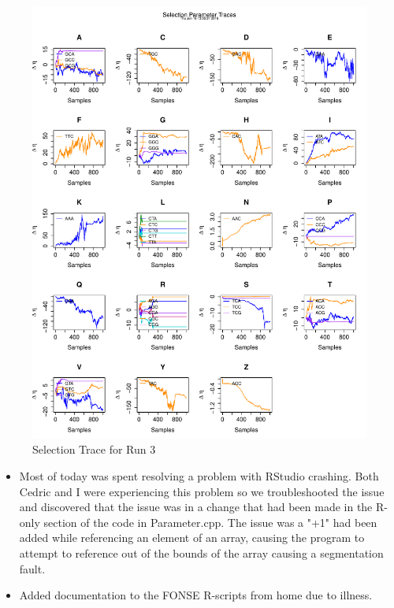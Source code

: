 \documentclass[11pt]{labbook}
\begin{document}
\begin{itemize}
\begin{figure}
            \includegraphics[scale=.65]{FONSE_Plots/2016/June_16/Run3_SelectionTrace}
            \caption{Selection Trace for Run 3}
            \label{fig:JUN16_SEL_R3}
        \end{figure}
    \end{itemize}
    
    \begin{itemize}
        \item Most of today was spent resolving a problem with RStudio crashing. Both Cedric and I were experiencing this problem so we troubleshooted the issue and discovered that the issue was in a change that had been made in the R-only section of the code in Parameter.cpp. The issue was a "+1" had been added while referencing an element of an array, causing the program to attempt to reference out of the bounds of the array causing a segmentation fault. 
    \end{itemize}
    \begin{itemize}
        \item Added documentation to the FONSE R-scripts from home due to illness.
    \end{itemize}
    
\end{document}
